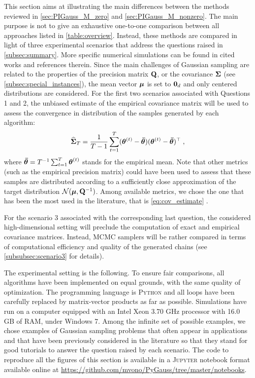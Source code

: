 \documentclass[nohypdvips,onefignum,onetabnum]{siamart171218}
\begin{document}
This section aims at illustrating the main differences between the methods reviewed in \cref{sec:PIGauss_M_zero} and \cref{sec:PIGauss_M_nonzero}.
The main purpose is not to give an exhaustive one-to-one comparison between all approaches listed in \cref{table:overview}.
Instead, these methods are compared in light of three experimental scenarios that address the questions raised in \cref{subsec:summary}. 
More specific numerical simulations can be found in cited works and references therein.
Since the main challenges of Gaussian sampling are related to the properties of the precision matrix $\mathbf{Q}$, or the covariance $\boldsymbol{\Sigma}$ (see \cref{subsec:special_instances}), the mean vector $\boldsymbol{\mu}$ is set to $\mathbf{0}_d$ and only centered distributions are considered.
For the first two scenarios associated with Questions 1 and 2, the unbiased estimate of the empirical covariance matrix will be used to assess the convergence in distribution of the samples generated by each algorithm:
\begin{equation}
  \B{\widehat{\Sigma}}_T = \dfrac{1}{T-1}\sum_{t=1}^T(\Bs{\theta}^{(t)} - \Bs{\bar{\theta}})(\Bs{\theta}^{(t)} - \Bs{\bar{\theta}})^{\top}\eqsp, \label{eq:cov_estimate}
\end{equation}
where $\boldsymbol{\bar{\theta}} = T^{-1}\sum_{t=1}^T\boldsymbol{\theta}^{(t)}$ stands for the empirical mean. 
Note that other metrics (such as the empirical precision matrix) could have been used to assess that these samples are distributed according to a sufficiently close approximation of the target distribution $\mathcal{N}(\boldsymbol{\mu},\mathbf{Q}^{-1})$.
Among available metrics, we chose the one that has been the most used in the literature, that is \cref{eq:cov_estimate} \cite{Gilavert2015,Fox2017,Barbos2017}. 


For the scenario 3 associated with the corresponding last question, the considered high-dimensional setting will preclude the computation of exact and empirical covariance matrices. Instead, MCMC samplers will be rather compared in terms of computational efficiency and quality of the generated chains (see \cref{subsubsec:scenario3} for details).


The experimental setting is the following. To ensure fair comparisons, all algorithms have been implemented on equal grounds, with the same quality of optimization.
The programming language is \textsc{Python} and all loops have been carefully replaced by  matrix-vector products as far as possible.
Simulations have run on a computer equipped with an Intel Xeon 3.70 GHz processor with 16.0 GB of RAM, under Windows 7.
Among the infinite set of possible examples, we chose examples of Gaussian sampling problems that often appear in applications and that have been previously considered in the literature so that they stand for good tutorials to answer the question raised by each scenario.
The code to reproduce all the figures of this section is available in a \textsc{Jupyter} notebook format available online at \url{https://github.com/mvono/PyGauss/tree/master/notebooks}.
\end{document}
